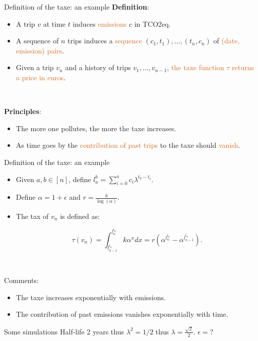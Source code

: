 \documentclass[french,english]{beamer}
\newcommand{\chocolate}[1]{\textcolor{chocolate}{#1}}
\begin{document}
\begin{frame}{Definition of the taxe: an example}
\textbf{Definition}:
\begin{itemize}
\item A trip $v$ at time $t$ induces \chocolate{emissions} $c$ in TCO2eq.
\item A sequence of $n$ trips induces a \chocolate{sequence} $(c_1,t_1),\ldots,(t_n,c_n)$ of \chocolate{(date, emission) pairs}.
\item Given a trip $v_n$ and a history of trips $v_1,\ldots, v_{n-1}$, \chocolate{the taxe function $\tau$ returns a price in euros}.  
\end{itemize}

\

\textbf{Principles}:
\begin{itemize}
\item The more one pollutes, the more the taxe increases. 
\item As time goes by the \chocolate{contribution of past trips} to the taxe should \chocolate{vanish}.
\end{itemize}
\end{frame}


\begin{frame}{Definition of the taxe: an example}
    \begin{itemize}
    \item Given $a,b \in [n]$, define $l_a^{b} = \sum_{i = 0}^a c_i \lambda^{t_b - t_i}$.
    \item Define $\alpha = 1 + \epsilon$ and $r = \frac{k}{\log(\alpha)}$.
    \item The tax of $v_n$ is defined as: \begin{tcolorbox}$$ \tau(v_n) = \int_{l_{n-1}^{t_n}}^{l_n^{t_n}} k \alpha^x dx = r (\alpha^{l_n^{t_n}} - \alpha^{l_{n - 1}^{t_n}}).$$\end{tcolorbox}
    \end{itemize}	
    
    \

   Comments:
   \begin{itemize}
   \item The taxe increases exponentially with emissions.
   \item The contribution of past emissions vanishes exponentially with time.
   \end{itemize}

\end{frame}

\begin{frame}{Some simulations}
    Half-life 2 years thus $\lambda^2 = 1/2$ thus $\lambda = \frac{\sqrt{2}}{2}$.
    $\epsilon = ?$
\end{frame}
\end{document}
